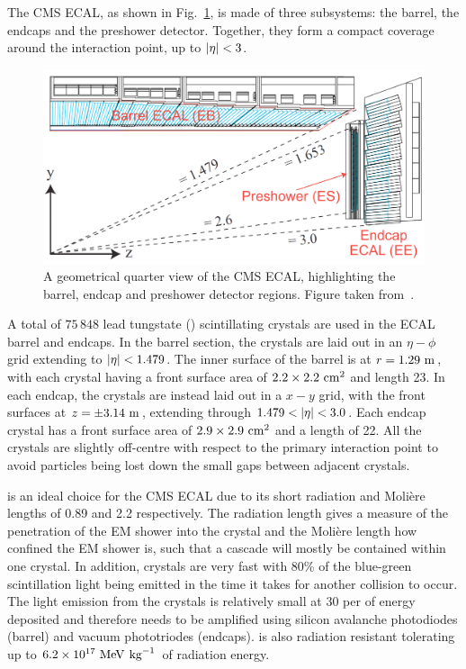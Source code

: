 The CMS ECAL, as shown in Fig.~\ref{fig:CMSECAL}, is made of three subsystems: the barrel, the endcaps and the preshower detector.
Together, they form a compact coverage around the interaction point, up to $\lvert \eta \rvert<3$.
\begin{figure}[htpb]
	\centering
	\includegraphics[width=\textwidth]{Figures/CMSECAL2}
	\caption[A geometrical quarter view of the CMS ECAL, highlighting the barrel, endcap and preshower detector regions.]{A geometrical quarter view of the CMS ECAL, highlighting the barrel, endcap and preshower detector regions. Figure taken from~\cite{CMSTDRV1}.}
	\label{fig:CMSECAL}
\end{figure}
A total of $75\,848$ lead tungstate (\PbWO{}) scintillating crystals are used in the ECAL barrel and endcaps.
In the barrel section, the crystals are laid out in an $\eta-\phi$ grid extending to $\lvert \eta \rvert<1.479$.
The inner surface of the barrel is at $r=1.29\mathrm{~m}^{}$, with each crystal having a front surface area of $2.2\times2.2\mathrm{~cm}^{2}$ and length 23\cm{}.
In each endcap, the crystals are instead laid out in a $x-y$ grid, with the front surfaces at $z=\pm 3.14\mathrm{~m}^{}$, extending through $1.479 < \lvert \eta \rvert < 3.0$. 
Each endcap crystal has a front surface area of $2.9\times2.9\mathrm{~cm}^{2}$ and a length of 22\cm{}.
All the crystals are slightly off-centre with respect to the primary interaction point to avoid particles being lost down the small gaps between adjacent crystals.

\PbWO{} is an ideal choice for the CMS ECAL due to its short radiation and Moli\`ere lengths of 0.89 and 2.2\cm{} respectively. 
The radiation length gives a measure of the penetration of the EM shower into the crystal and the Moli\`ere length how confined the EM shower is, such that a cascade will mostly be contained within one crystal. 
In addition, \PbWO{} crystals are very fast with 80\% of the blue-green scintillation light being emitted in the time it takes for another collision to occur.
The light emission from the \PbWO{} crystals is relatively small at 30\photon{} per\MeV{} of energy deposited and therefore needs to be amplified using silicon avalanche photodiodes (barrel) and vacuum phototriodes (endcaps).
\PbWO{} is also radiation resistant tolerating up to $6.2\times \text{10}^\text{17}\mathrm{~Me\hspace{-.08em}V}^{}\mathrm{~kg}^{-1}$ of radiation energy.

